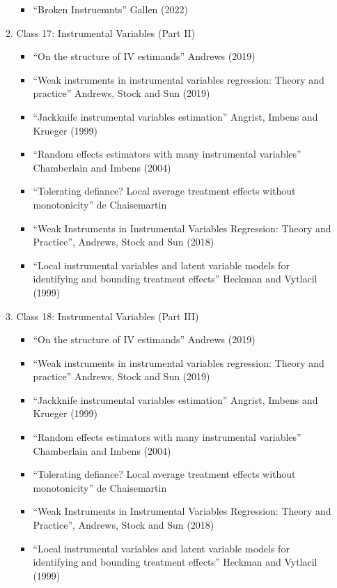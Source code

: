 \documentclass[11pt, a4paper]{article}
\begin{document}
\begin{enumerate}
\begin{enumerate}
\begin{itemize}
    \item ``Broken Instruemnts'' Gallen (2022)
    \end{itemize}
  \item Class 17: Instrumental Variables (Part II)
    \begin{itemize}
    \item ``On the structure of IV estimands'' Andrews (2019)
    \item ``Weak instruments in instrumental variables regression: Theory and practice'' Andrews, Stock and Sun (2019)
    \item ``Jackknife instrumental variables estimation'' Angrist, Imbens and Krueger (1999)
    \item ``Random effects estimators with many instrumental variables'' Chamberlain and Imbens (2004)
    \item ``Tolerating defiance? Local average treatment effects without monotonicity'' de Chaisemartin
    \item ``Weak Instruments in Instrumental Variables Regression: Theory and Practice'', Andrews, Stock and Sun (2018)
    \item ``Local instrumental variables and latent variable models for identifying and bounding treatment effects'' Heckman and Vytlacil (1999)
    \end{itemize}
  \item Class 18: Instrumental Variables (Part III)
    \begin{itemize}
    \item ``On the structure of IV estimands'' Andrews (2019)
    \item ``Weak instruments in instrumental variables regression: Theory and practice'' Andrews, Stock and Sun (2019)
    \item ``Jackknife instrumental variables estimation'' Angrist, Imbens and Krueger (1999)
    \item ``Random effects estimators with many instrumental variables'' Chamberlain and Imbens (2004)
    \item ``Tolerating defiance? Local average treatment effects without monotonicity'' de Chaisemartin
    \item ``Weak Instruments in Instrumental Variables Regression: Theory and Practice'', Andrews, Stock and Sun (2018)
    \item ``Local instrumental variables and latent variable models for identifying and bounding treatment effects'' Heckman and  Vytlacil (1999)
    \end{itemize}

\end{enumerate}
\end{enumerate}
\end{document}
